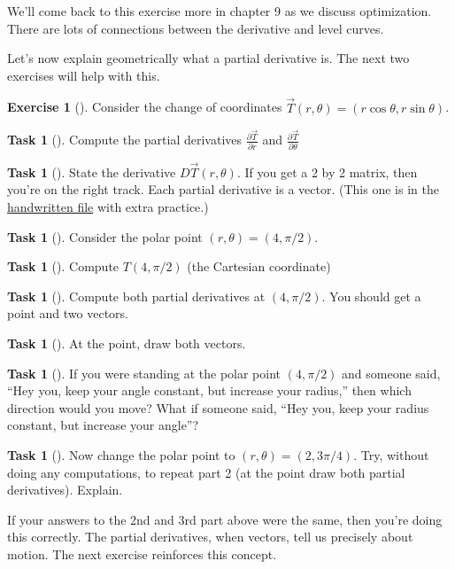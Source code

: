 \documentclass[10pt,]{book}
\theoremstyle{plain}
\theoremstyle{definition}
\theoremstyle{definition}
\theoremstyle{definition}
\theoremstyle{definition}
\newtheorem{exploration}[project]{Exercise}
\newtheorem{task}[project]{Task}
\theoremstyle{definition}
\numberwithin{equation}{section}
\newcommand{\ds}{\displaystyle}
\begin{document}
We'll come back to this exercise more in chapter 9 as we discuss optimization. There are lots of connections between the derivative and level curves.%
\par
Let's now explain geometrically what a partial derivative is. The next two exercises will help with this.%
\begin{exploration}[]\label{exploration-139}
Consider the change of coordinates \(\vec T(r,\theta) = (r\cos \theta, r\sin \theta)\).%
\begin{task}[]\label{task-292}
Compute the partial derivatives \(\ds\frac{\partial \vec T}{\partial r}\) and \(\ds\frac{\partial \vec T}{\partial \theta}\)%
\end{task}
\begin{task}[]\label{task-293}
State the derivative \(D\vec T(r,\theta)\). If you get a 2 by 2 matrix, then you're on the right track. Each partial derivative is a vector. (This one is in the \href{http://db.tt/cSeKG8XO}{handwritten file} with extra practice.)%
%
\end{task}
\begin{task}[]\label{task-294}
Consider the polar point \((r,\theta) = (4,\pi/2)\).%
\begin{task}[]\label{task-295}
Compute \(T(4,\pi/2)\) (the Cartesian coordinate)%
\end{task}
\begin{task}[]\label{task-296}
Compute both partial derivatives at \((4,\pi/2)\). You should get a point and two vectors.%
%
\end{task}
\begin{task}[]\label{task-297}
At the point, draw both vectors.%
\end{task}
\end{task}
\begin{task}[]\label{task-298}
If you were standing at the polar point \((4,\pi/2)\) and someone said, ``Hey you, keep your angle constant, but increase your radius,'' then which direction would you move?  What if someone said, ``Hey you, keep your radius constant, but increase your angle''?%
\end{task}
\begin{task}[]\label{task-299}
Now change the polar point to \((r,\theta) = (2,3\pi/4)\).  Try, without doing  any computations, to repeat part 2 (at the point draw both partial derivatives). Explain.%
\end{task}
\end{exploration}
If your answers to the 2nd and 3rd part above were the same, then you're doing this correctly. The partial derivatives, when vectors, tell us precisely about motion. The next exercise reinforces this concept.%
\end{document}
